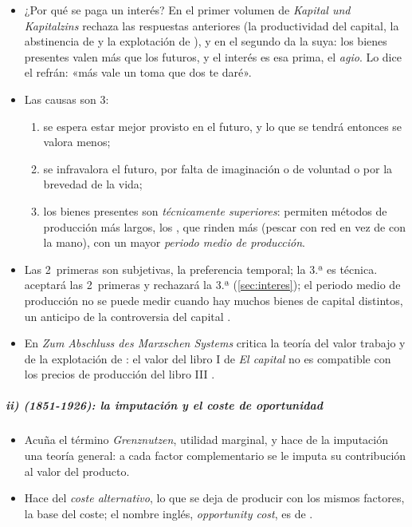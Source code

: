\documentclass[11pt]{article}
\begin{document}
\begin{itemize}
\item ¿Por qué se paga un interés? En el primer volumen de \emph{Kapital und Kapitalzins}\nocite{BohmBawerk1884Geschichte} rechaza las respuestas anteriores (la productividad del capital, la abstinencia de  y la explotación de ), y en el segundo\nocite{BohmBawerk1889Positive} da la suya: los bienes presentes valen más que los futuros, y el interés es esa prima, el \emph{agio}. Lo dice el refrán: «más vale un toma que dos te daré».
\item Las causas son 3:
  \begin{enumerate}
  \item se espera estar mejor provisto en el futuro, y lo que se tendrá entonces se valora menos;
  \item se infravalora el futuro, por falta de imaginación o de voluntad o por la brevedad de la vida;
  \item los bienes presentes son \emph{técnicamente superiores}: permiten métodos de producción más largos, los , que rinden más (pescar con red en vez de con la mano), con un mayor \emph{periodo medio de producción}.
  \end{enumerate}
\item Las 2~primeras son subjetivas, la preferencia temporal; la 3.ª es técnica.  aceptará las 2~primeras y rechazará la 3.ª (\ref{sec:interes}); el periodo medio de producción no se puede medir cuando hay muchos bienes de capital distintos, un anticipo de la controversia del capital .
\item En \emph{Zum Abschluss des Marxschen Systems}\nocite{BohmBawerk1896Abschluss} critica la teoría del valor trabajo y de la explotación de : el valor del libro I de \emph{El capital} no es compatible con los precios de producción del libro III .
\end{itemize}

\subparagraph{ii)  (1851-1926): la imputación y el coste de oportunidad}

\begin{itemize}
\item Acuña el término \emph{Grenznutzen}, utilidad marginal\nocite{Wieser1884Ursprung}, y hace de la imputación una teoría general: a cada factor complementario se le imputa su contribución al valor del producto\nocite{Wieser1889Naturliche,HET2026Wieser}.
\item Hace del \emph{coste alternativo}, lo que se deja de producir con los mismos factores, la base del coste\nocite{Wieser1889Naturliche}; el nombre inglés, \emph{opportunity cost}, es de \textcite{Green1894Pain}.
\end{itemize}
\end{document}

